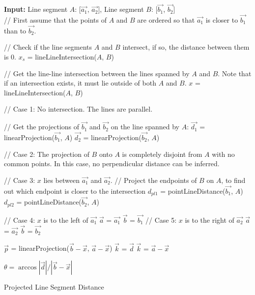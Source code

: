 \documentclass{kththesis}
\begin{document}
\begin{algorithm}[H]
\SetAlgoLined
{}
    \textbf{Input:} Line segment $A$: [$\vec{a_1}$, $\vec{a_2}$], Line segment $B$: [$\vec{b_1}$, $\vec{b_2}$]\\
    // First assume that the points of $A$ and $B$ are ordered so that $\vec{a_1}$ is closer to $\vec{b_1}$ than to $\vec{b_2}$.

    // Check if the line segments $A$ and $B$ intersect, if so, the distance between them is 0.
    $x_s$ = lineLineIntersection($A$, $B$)\;
     {
    }

    // Get the line-line intersection between the lines spanned by $A$ and $B$. Note that if an intersection exists, it must lie outside of both $A$ and $B$.
    $x$ = lineLineIntersection($A$, $B$)\;

    // Case 1: No intersection. The lines are parallel.
     {
        \;
    }

    // Get the projections of $\vec{b_1}$ and $\vec{b_2}$ on the line spanned by $A$:
    $\vec{d_1}$ = linearProjection($\vec{b_1}$, $A$)\;
    $\vec{d_2}$ = linearProjection($\vec{b_2}$, $A$)\;

    // Case 2: The projection of $B$ onto $A$ is completely disjoint from $A$ with no common points. In this case, no perpendicular distance can be inferred.
     {
        \;
    }

    // Case 3: $x$ lies between $\vec{a_1}$ and $\vec{a_2}$.
     {
        // Project the endpoints of $B$ on $A$, to find out which endpoint is closer to the intersection
        $d_{pl1}$ = pointLineDistance($\vec{b_1}$, $A$)\;
        $d_{pl2}$ = pointLineDistance($\vec{b_2}$, $A$)\;
         {
            \;
        } {
            \;
        }
    }

     {
        // Case 4: $x$ is to the left of $\vec{a_1}$
        $\vec{a}$ = $\vec{a_1}$\;
        $\vec{b}$ = $\vec{b_1}$\;
    } {
        // Case 5: $x$ is to the right of $\vec{a_2}$
        $\vec{a}$ = $\vec{a_2}$\;
        $\vec{b}$ = $\vec{b_2}$\;
    }

    $\vec{p}$ = linearProjection($\vec{b}-\vec{x}$, $\vec{a}-\vec{x}$)\;
     {
        $\vec{k}$ = $\vec{d}$\;
    } {
        $\vec{k}$ = $\vec{a}-\vec{x}$\;
    }

    $\theta = \arccos{|\vec{d}|/|\vec{b}-\vec{x}|}$\;

    \caption{Projected Line Segment Distance}
\end{algorithm}
\end{document}
